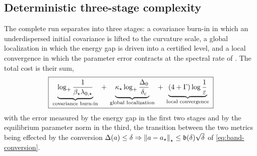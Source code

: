 \subsection{Deterministic three-stage complexity}
\label{subsec:three-stage}

The complete run separates into three stages: a covariance burn-in in which an underdispersed
initial covariance is lifted to the curvature scale, a global localization in which the energy
gap is driven into a certified level, and a local convergence in which the parameter error
contracts at the spectral rate of . The total cost is their sum,
\begin{equation}
\label{eq:three-stage-box}
    \boxed{\;
    \underbrace{\log_+\frac1{\beta_\star\lambda_{0,\star}}}_{\text{covariance burn-in}}
    \;+\;
    \underbrace{\kappa_\star\log_+\frac{\Delta_0}{\delta_{\mathrm c}}}_{\text{global localization}}
    \;+\;
    \underbrace{(4+\Gamma)\log\frac1\varepsilon}_{\text{local convergence}}\;}
\end{equation}
with the error measured by the energy gap in the first two stages and by the equilibrium
parameter norm in the third, the transition between the two metrics being effected by the
conversion $\Delta(a)\leq\delta\Rightarrow\left\lVert a-a_\star\right\rVert_\star\leq\mathfrak b(\delta)\sqrt\delta$
of \eqref{eq:band-conversion}.

